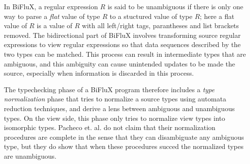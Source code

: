 \documentclass[acmsmall,review,anonymous]{acmart}
\begin{document}
In BiFluX, a regular expression $R$ is said to be unambiguous if there is only
one way to parse a {\em flat} value of type $R$ to a stuctured value of type
$R$; here a flat value of $R$ is a value of $R$ with all left/right tags,
parantheses and list brackets removed. The bidirectional part of BiFluX involves
transforming source regular expressions to view regular expressions so that
data sequences described by the two types can be matched. This process can
result in intermediate types that are ambiguous, and this ambiguity can cause
unintended updates to be made the source, especially when information is
discarded in this process.

The typechecking phase of a BiFluX program therefore includes a {\em type
normalization} phase that tries to normalize a source types using automata
reduction techniques, and derive a lens between ambiguous and unambiguous
types. On the view side, this phase only tries to normalize view types into
isomorphic types. Pacheco et. al. do not claim that their normalization
procedures are complete in the sense that they can disambiguate any ambiguous
type, but they do show that when these procedures succed the normalized types
are unambiguous.
\end{document}
